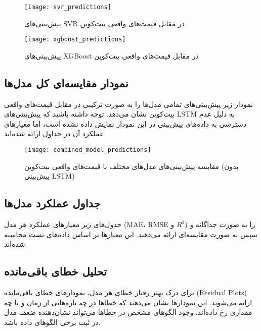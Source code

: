 \begin{figure}[H]
	\centering
	\texttt{[image: svr\_predictions]}
	\caption{پیش‌بینی‌های SVR در مقابل قیمت‌های واقعی بیت‌کوین}
	\label{fig:svr_predictions}
\end{figure}

\begin{figure}[H]
	\centering
	\texttt{[image: xgboost\_predictions]}
	\caption{پیش‌بینی‌های XGBoost در مقابل قیمت‌های واقعی بیت‌کوین}
	\label{fig:xgboost_predictions}
\end{figure}



\subsection{نمودار مقایسه‌ای کل مدل‌ها}
نمودار زیر پیش‌بینی‌های تمامی مدل‌ها را به صورت ترکیبی در مقابل قیمت‌های واقعی بیت‌کوین نشان می‌دهد. توجه داشته باشید که پیش‌بینی‌های LSTM به دلیل عدم دسترسی به داده‌های پیش‌بینی در این نمودار نمایش داده نشده است، اما معیارهای عملکرد آن در جداول ارائه شده‌اند.

\begin{figure}[H]
	\centering
	\texttt{[image: combined\_model\_predictions]}
	\caption{مقایسه پیش‌بینی‌های مدل‌های مختلف با قیمت‌های واقعی بیت‌کوین (بدون پیش‌بینی LSTM)}
	\label{fig:combined_model_predictions}
\end{figure}

\subsection{جداول عملکرد مدل‌ها}
جدول‌های زیر معیارهای عملکرد هر مدل (MAE، RMSE و $ R^2 $) را به صورت جداگانه و سپس به صورت مقایسه‌ای ارائه می‌دهند. این معیارها بر اساس داده‌های تست محاسبه شده‌اند.











\subsection{تحلیل خطای باقی‌مانده}
برای درک بهتر رفتار خطای هر مدل، نمودارهای خطای باقی‌مانده (Residual Plots) ارائه می‌شوند. این نمودارها نشان می‌دهند که خطاها در چه بازه‌هایی از زمان و با چه مقداری رخ داده‌اند. وجود الگوهای مشخص در خطاها می‌تواند نشان‌دهنده ضعف مدل در ثبت برخی الگوهای داده باشد.

